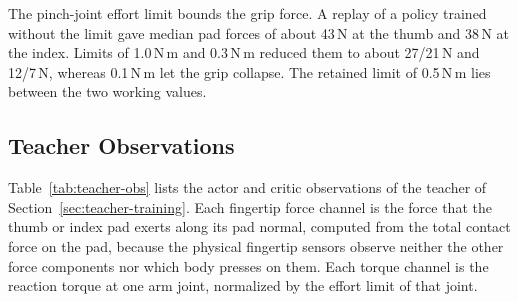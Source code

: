 The pinch-joint effort limit bounds the grip force. A replay of a policy trained without the limit gave median pad forces of about 43\,N at the thumb and 38\,N at the index. Limits of 1.0\,N\,m and 0.3\,N\,m reduced them to about 27/21\,N and 12/7\,N, whereas 0.1\,N\,m let the grip collapse. The retained limit of 0.5\,N\,m lies between the two working values.

\subsection{Teacher Observations}\label{sec:app-teacher-obs}

Table~\ref{tab:teacher-obs} lists the actor and critic observations of the teacher of Section~\ref{sec:teacher-training}. Each fingertip force channel is the force that the thumb or index pad exerts along its pad normal, computed from the total contact force on the pad, because the physical fingertip sensors observe neither the other force components nor which body presses on them. Each torque channel is the reaction torque at one arm joint, normalized by the effort limit of that joint.

